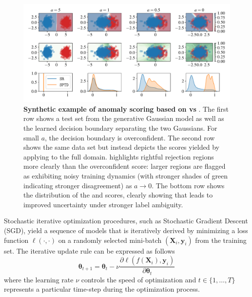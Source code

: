 \begin{figure}
    \centering
    \includegraphics[width=0.97\linewidth]{figs/sptd/gaussians_anom2.pdf}
    \caption[Synthetic example of anomaly scoring based on \sr vs \sptd.]{\textbf{Synthetic example of anomaly scoring based on \sr vs \sptd}. The first row shows a test set from the generative Gaussian model as well as the learned decision boundary separating the two Gaussians. For small $a$, the decision boundary is overconfident. The second row shows the same data set but instead depicts the scores yielded by applying \sptd to the full domain. \sptd highlights rightful rejection regions more clearly than the overconfident \sr score: larger regions are flagged as exhibiting noisy training dynamics (with stronger shades of green indicating stronger disagreement) as $a \rightarrow 0$. 
    The bottom row shows the distribution of the \sr and \sptd scores, clearly showing that \sptd leads to improved uncertainty under stronger label ambiguity.}
    \label{fig:gauss}
\end{figure}


Stochastic iterative optimization procedures, such as Stochastic Gradient Descent (SGD), yield a sequence of models that is iteratively derived by minimizing a loss function $\ell(\cdot,\cdot)$ on a randomly selected mini-batch $(\bm{X}_i, \bm{y}_i)$ from the training set. The iterative update rule can be expressed as follows %
\begin{equation}
    \bm{\theta}_{t+1} = \bm{\theta}_{t} - \nu \frac{\partial \ell(f(\bm{X}_i), \bm{y}_i)}{\partial \bm{\theta}_{t}}
\end{equation}
where the learning rate $\nu$ controls the speed of optimization and $t \in \{1,\ldots,T\}$ represents a particular time-step during the optimization process.

